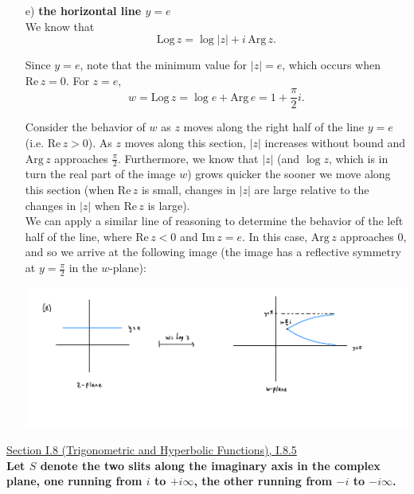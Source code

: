 \documentclass[11pt]{article}
\theoremstyle{definition}
\begin{document}
\begin{enumerate}[a)]
\item[e)] \textbf{the horizontal line $y=e$} \\

We know that \[\mathrm{Log} \, z = \log |z| + i \, \mathrm{Arg} \, z.\]

Since $y = e$, note that the minimum value for $|z| = e$, which occurs when $\mathrm{Re} \, z = 0.$ For $z = e$, \[w = \mathrm{Log} \, z = \log e + \mathrm{Arg} \, e = 1 + \frac{\pi}{2}i.\]

Consider the behavior of $w$ as $z$ moves along the right half of the line $y = e$ (i.e. $\mathrm{Re} \, z > 0$). As $z$ moves along this section, $|z|$ increases without bound and $\mathrm{Arg} \, z$ approaches $\frac{\pi}{2}$.
Furthermore, we know that $|z|$ (and $\log z$, which is in turn the real part of the image $w$) grows quicker the sooner we move along this section (when $\mathrm{Re} \, z$ is small, changes in $|z|$ are large relative to the changes in $|z|$ when $\mathrm{Re} \, z$ is large). \\

We can apply a similar line of reasoning to determine the behavior of the left half of the line, where $\mathrm{Re} \, z < 0$ and $\mathrm{Im} \, z = e$. In this case, $\mathrm{Arg} \, z$ approaches $0$, and so we arrive at the following image (the image has a reflective symmetry at $y = \frac{\pi}{2}$ in the $w$-plane): 

\begin{center}
  \includegraphics*[scale = 0.15]{I.6.2e.jpeg}
\end{center}

\end{enumerate}

\newpage






\underline{Section I.8 (Trigonometric and Hyperbolic Functions), I.8.5} \\

\textbf{Let $S$ denote the two slits along the imaginary axis in the complex plane, one running from $i$ to $+i\infty$, the other running from $-i$ to $-i\infty$.}
\end{document}
